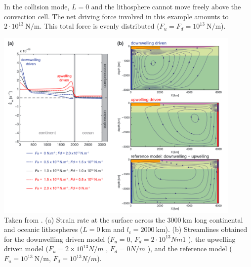 In the collision mode, $L = 0$ and the lithosphere cannot
move freely above the convection cell. The net driving force involved in this
example amounts to $2\cdot 10^{13}~\si{\newton\per\meter}$. This total force is evenly
distributed ($F_u = F_d = 10^{13}~\si{\newton\per\meter}$). 




\begin{center}
\includegraphics[width=12cm]{python_codes/fieldstone_143/images/yahb13_c}\\
{\captionfont Taken from \cite{yahb13}.
(a) Strain rate at the surface across the $3000~\si{\km}$ long continental and oceanic lithospheres
($L=0~\si{\km}$ and $l_ c=2000~\si{\km}$). 
(b) Streamlines obtained for the downwelling driven model
($F_u=0$, $F_d=2 \cdot 10^{13} N m 1$ ), 
the upwelling driven model ($F_u = 2 \times 10^{13} N/m$ , $F_d = 0 N/m$ ), and
the reference model ($F_u=10^{13}~\si{\newton\per\meter}$, $F_d = 10^{13} N/m$).
}
\end{center}













































